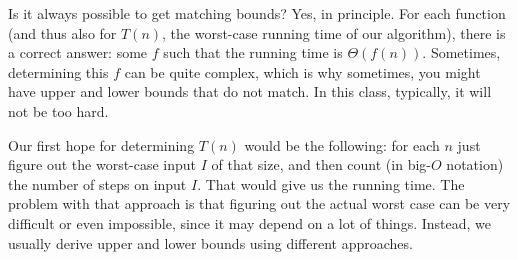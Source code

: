 Is it always possible to get matching bounds? 
Yes, in principle.
For each function (and thus also for $T(n)$, the worst-case running
time of our algorithm), there is a correct answer: some $f$ such that
the running time is $\Theta(f(n))$. Sometimes, determining this $f$
can be quite complex, which is why sometimes, you might have upper and lower
bounds that do not match. 
In this class, typically, it will not be too hard. 

Our first hope for determining $T(n)$ would be the following:
for each $n$ just figure out the worst-case input $I$ of that size,
and then count (in big-$O$ notation) the number of steps on input
$I$. That would give us the running time.
The problem with that approach is that figuring out the actual worst
case can be very difficult or even impossible, since it may depend on
a lot of things. Instead, we usually derive upper and lower bounds
using different approaches.


